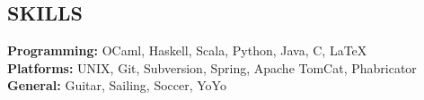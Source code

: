 \documentclass[line,margin]{res}
\begin{document}
\begin{resume}
  \section{SKILLS}
  {\bf Programming:} OCaml, Haskell, Scala, Python, Java, C, \LaTeX \\
  {\bf Platforms:} UNIX, Git, Subversion, Spring,
  Apache TomCat, Phabricator \\
  {\bf General:} Guitar, Sailing, Soccer, YoYo \\
\end{resume}
\end{document}
